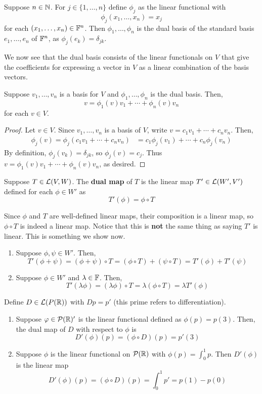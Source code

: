 \begin{example}
    Suppose $n\in\mathbb{N}$. For $j \in \{1, \dots, n\}$ define $\phi_j$ as the linear functional with
    \[ \phi_j(x_1, \dots, x_n) = x_j \]
    for each $(x_1, \dots, x_n) \in \mathbb F^n$. Then $\phi_1, \dots, \phi_n$ is the dual basis of the standard basis $e_1, \dots, e_n$ of $\mathbb F^n$, as $\phi_j(e_k) = \delta_{jk}$.
\end{example}
We now see that the dual basis consists of the linear functionals on $V$ that give the coefficients for expressing a vector in $V$ as a linear combination of the basis vectors.
\begin{theorem}
    Suppose $v_1, \dots, v_n$ is a basis for $V$ and $\phi_1, \dots, \phi_n$ is the dual basis. Then,
    \[ v = \phi_1(v)v_1 + \cdots + \phi_n(v)v_n \]
    for each $v\in V$.
\end{theorem}
\begin{proof}
    Let $v\in V$. Since $v_1, \dots, v_n$ is a basis of $V$, write $v = c_1v_1 + \cdots + c_nv_n$. Then, 
    \begin{align*}
        \phi_j(v) = \phi_j(c_1v_1 + \cdots + c_nv_n) &= c_1\phi_j(v_1) + \cdots + c_n\phi_j(v_n)
    \end{align*}
    By definition, $\phi_j(v_k) = \delta_{jk}$, so $\phi_j(v) = c_j$. Thus $v = \phi_1(v)v_1 + \cdots + \phi_n(v)v_n$, as desired.
\end{proof}
\begin{definition}
    Suppose $T\in\mathcal{L}(V,W)$. The \textbf{dual map} of $T$ is the linear map  $T' \in \mathcal{L}(W', V')$ defined for each $\phi \in W'$ as
    \[ T'(\phi) = \phi \circ T \]
\end{definition}
Since $\phi$ and $T$ are well-defined linear maps, their composition is a linear map, so $\phi \circ T$ is indeed a linear map. Notice that this is \textbf{not} the same thing as saying $T'$ is linear. This is something we show now.
\begin{enumerate}
    \item Suppose $\phi, \psi \in W'$. Then,
    \[ T'(\phi + \psi) = (\phi + \psi) \circ T = (\phi \circ T) + (\psi \circ T) = T'(\phi) + T'(\psi) \]
    \item Suppose $\phi\in W'$ and $\lambda\in\mathbb F$. Then,
    \[ T'(\lambda \phi) = (\lambda \phi)\circ T = \lambda (\phi \circ T) = \lambda T'(\phi)\]
\end{enumerate}
\begin{example}
    Define $D \in \mathcal{L}(P(\mathbb{R}))$ with $Dp = p'$ (this prime refers to differentiation).
    \begin{enumerate}
        \item Suppose $\varphi \in \mathcal{P}(\mathbb{R})'$ is the linear functional defined as $\phi(p) = p(3)$. Then, the dual map of $D$ with respect to $\phi$ is 
        \[ D'(\phi)(p) = (\phi \circ D)(p) = p'(3)\]
        \item Suppose $\phi$ is the linear functional on $\mathcal{P}(\mathbb{R})$ with $\phi(p) = \int_0^1 p$. Then $D'(\phi)$ is the linear map
        \[ D'(\phi)(p) = (\phi \circ D)(p) = \int_0^1 p' = p(1) - p(0)\]
    \end{enumerate}
\end{example}

